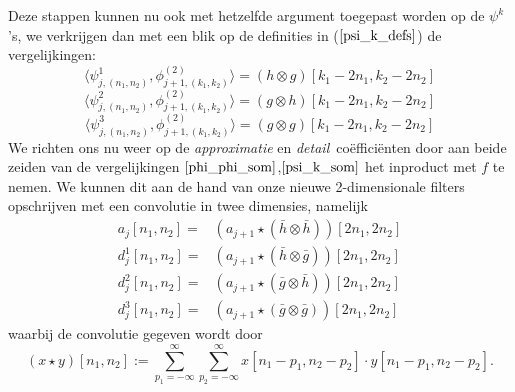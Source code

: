 \documentclass[11pt]{uvamath}
\theoremstyle{plain}
\theoremstyle{definition}
\theoremstyle{remark}
\newcommand{\inpr}[2]{\langle #1 , #2 \rangle}
\begin{document}
Deze stappen kunnen nu ook met hetzelfde argument toegepast worden op de $\psi^k$'s,
we verkrijgen dan met een blik op de definities in ($\ref{psi_k_defs}$) de vergelijkingen:
\[
\inpr{\psi^1_{j,(n_1,n_2)}}{\phi^{(2)}_{j+1,(k_1,k_2)}} = (h\otimes g) [k_1-2n_1,k_2-2n_2]
\]
\[
\inpr{\psi^2_{j,(n_1,n_2)}}{\phi^{(2)}_{j+1,(k_1,k_2)}} = (g\otimes h) [k_1-2n_1,k_2-2n_2]
\]
\[
\inpr{\psi^3_{j,(n_1,n_2)}}{\phi^{(2)}_{j+1,(k_1,k_2)}} = (g\otimes g) [k_1-2n_1,k_2-2n_2]
\]
We richten ons nu weer op de \emph{approximatie} en \emph{detail}~co\"effici\"enten door
aan beide zeiden van de vergelijkingen $\ref{phi_phi_som}$,$\ref{psi_k_som}$ het inproduct
met $f$ te nemen. We kunnen dit aan de hand van onze nieuwe 2-dimensionale filters
opschrijven met een convolutie in twee dimensies, namelijk
\begin{eqnarray}
  \label{2d_coef_rec}
  a_{j}[n_1,n_2] =& (a_{j+1} \star (\bar{h} \otimes \bar{h}))[2n_1,2n_2] \\
  d^1_{j}[n_1,n_2] =&( a_{j+1} \star (\bar{h} \otimes \bar{g}))[2n_1,2n_2] \\
  d^2_{j}[n_1,n_2] =& (a_{j+1} \star (\bar{g} \otimes \bar{h}))[2n_1,2n_2] \\
  \label{2d_coef_rec_last}
  d^3_{j}[n_1,n_2] =& (a_{j+1} \star (\bar{g} \otimes \bar{g}))[2n_1,2n_2]
\end{eqnarray}
waarbij de convolutie gegeven wordt door
\[
(x \star y)[n_1,n_2] := \sum_{p_1=-\infty}^\infty \sum_{p_2 = -\infty}^\infty
x[n_1 - p_1,n_2 - p_2] \cdot y[n_1-p_1, n_2 - p_2].
\]
\end{document}
